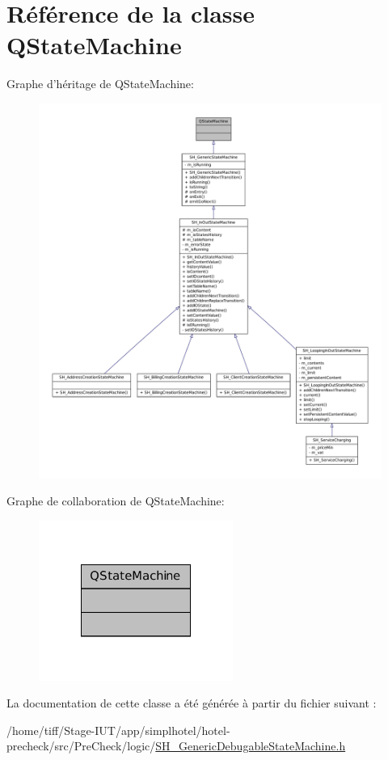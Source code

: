 \hypertarget{classQStateMachine}{\section{Référence de la classe Q\-State\-Machine}
\label{classQStateMachine}
}


Graphe d'héritage de Q\-State\-Machine\-:
\nopagebreak
\begin{figure}[H]
\begin{center}
\leavevmode
\includegraphics[width=350pt]{classQStateMachine__inherit__graph}
\end{center}
\end{figure}


Graphe de collaboration de Q\-State\-Machine\-:\nopagebreak
\begin{figure}[H]
\begin{center}
\leavevmode
\includegraphics[width=180pt]{classQStateMachine__coll__graph}
\end{center}
\end{figure}


La documentation de cette classe a été générée à partir du fichier suivant \-:\begin{DoxyCompactItemize}
\item 
/home/tiff/\-Stage-\/\-I\-U\-T/app/simplhotel/hotel-\/precheck/src/\-Pre\-Check/logic/\hyperlink{SH__GenericDebugableStateMachine_8h}{S\-H\-\_\-\-Generic\-Debugable\-State\-Machine.\-h}\end{DoxyCompactItemize}
